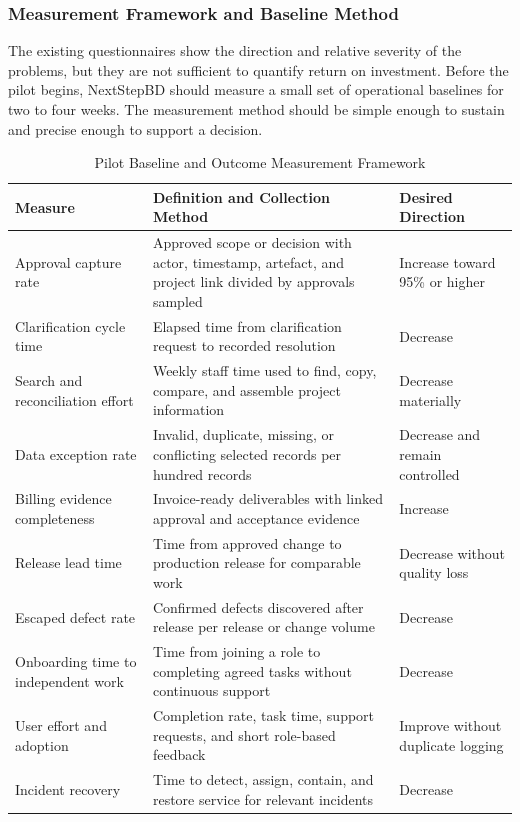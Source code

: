 \documentclass[12pt,a4paper]{report}
\begin{document}
\subsubsection{Measurement Framework and Baseline Method}
\label{sec:measurement-framework}

The existing questionnaires show the direction and relative severity of the problems, but they are
not sufficient to quantify return on investment. Before the pilot begins, NextStepBD should measure
a small set of operational baselines for two to four weeks. The measurement method should be
simple enough to sustain and precise enough to support a decision.

\begin{table}[H]
\centering
\caption{Pilot Baseline and Outcome Measurement Framework}
\label{tab:measurement-framework}
\small
\renewcommand{\arraystretch}{1.17}
\begin{tabularx}{\textwidth}{>{\raggedright\arraybackslash}p{3.0cm}
                                >{\raggedright\arraybackslash}X
                                >{\raggedright\arraybackslash}p{3.3cm}}
\toprule
\textbf{Measure} & \textbf{Definition and Collection Method} & \textbf{Desired Direction} \\
\midrule
Approval capture rate & Approved scope or decision with actor, timestamp, artefact, and project link divided by approvals sampled & Increase toward 95\% or higher \\
Clarification cycle time & Elapsed time from clarification request to recorded resolution & Decrease \\
Search and reconciliation effort & Weekly staff time used to find, copy, compare, and assemble project information & Decrease materially \\
Data exception rate & Invalid, duplicate, missing, or conflicting selected records per hundred records & Decrease and remain controlled \\
Billing evidence completeness & Invoice-ready deliverables with linked approval and acceptance evidence & Increase \\
Release lead time & Time from approved change to production release for comparable work & Decrease without quality loss \\
Escaped defect rate & Confirmed defects discovered after release per release or change volume & Decrease \\
Onboarding time to independent work & Time from joining a role to completing agreed tasks without continuous support & Decrease \\
User effort and adoption & Completion rate, task time, support requests, and short role-based feedback & Improve without duplicate logging \\
Incident recovery & Time to detect, assign, contain, and restore service for relevant incidents & Decrease \\
\bottomrule
\end{tabularx}
\end{table}
\end{document}
